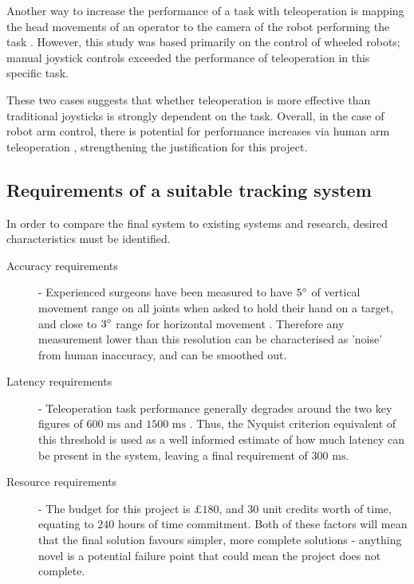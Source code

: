     Another way to increase the performance of a task with teleoperation is mapping the head movements of an operator to the camera of the robot performing the task \cite{ref:teleopanalysis}.
    However, this study was based primarily on the control of wheeled robots; manual joystick controls exceeded the performance of teleoperation in this specific task.
    
    These two cases suggests that whether teleoperation is more effective than traditional joysticks is strongly dependent on the task.
    Overall, in the case of robot arm control, there is potential for performance increases via human arm teleoperation \cite{ref:Zhou_Yang_Wang_Dong_2025}, strengthening the justification for this project.

  \subsection{Requirements of a suitable tracking system}
    In order to compare the final system to existing systems and research, desired characteristics must be identified.
    
    \begin{description}
      \item[Accuracy requirements] - Experienced surgeons have been measured to have \(5 ^\circ\) of vertical movement range on all joints when asked to hold their hand on a target, and close to \(3 ^\circ\) range for horizontal movement \cite{ref:movementrange}.
      Therefore any measurement lower than this resolution can be characterised as 'noise' from human inaccuracy, and can be smoothed out.
      \item[Latency requirements] - Teleoperation task performance generally degrades around the two key figures of \(600 \text{ ms}\) and \(1500 \text{ ms}\) \cite{ref:teleoplatency}.
      Thus, the Nyquist criterion equivalent of this threshold is used as a well informed estimate of how much latency can be present in the system, leaving a final requirement of \(300 \text{ ms}\).
      \item[Resource requirements] - The budget for this project is \(£180\), and \(30\) unit credits worth of time, equating to \(240\) hours of time commitment.
      Both of these factors will mean that the final solution favours simpler, more complete solutions - anything novel is a potential failure point that could mean the project does not complete.  
    \end{description}

